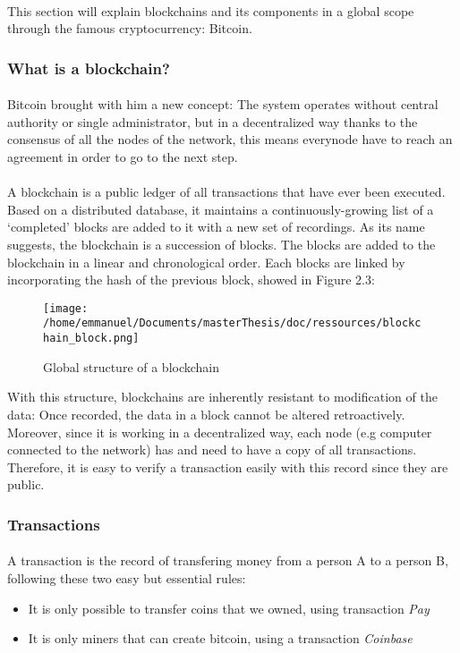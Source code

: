 \paragraph{}
This section will explain blockchains and its components in a global scope through the famous cryptocurrency: Bitcoin.

\subsubsection{What is a blockchain?}
\paragraph{}
Bitcoin brought with him a new concept: The system operates without central authority or single administrator, but in a decentralized way thanks to the consensus of all the nodes of the network, this means everynode have to reach an agreement in order to go to the next step. 
\paragraph{}
A blockchain is a public ledger of all transactions that have ever been executed. Based on a distributed database, it maintains a continuously-growing list of a ‘completed’ blocks are added to it with a new set of recordings. As its name suggests, the blockchain is a succession of blocks. The blocks are added to the blockchain in a linear and chronological order. Each blocks are linked by incorporating the hash of the previous block, showed in Figure 2.3:
\begin{figure}[htp]
\centering
\texttt{[image: /home/emmanuel/Documents/masterThesis/doc/ressources/blockchain\_block.png]}
\caption{Global structure of a blockchain}
\label{}
\end{figure}
\newline
With this structure, blockchains are inherently resistant to modification of the data: Once recorded, the data in a block cannot be altered retroactively. Moreover, since it is working in a decentralized way, each node (e.g computer connected to the network) has and need to have a copy of all transactions. Therefore, it is easy to verify a transaction easily with this record since they are public.

\subsubsection{Transactions}
\paragraph{}
A transaction is the record of transfering money from a person A to a person B, following these two easy but essential rules: 
\begin{itemize}
  \setlength\itemsep{0em}

  \item It is only possible to transfer coins that we owned, using transaction \emph{Pay}
  \item It is only miners that can create bitcoin, using a transaction \emph{Coinbase}
\end{itemize}
